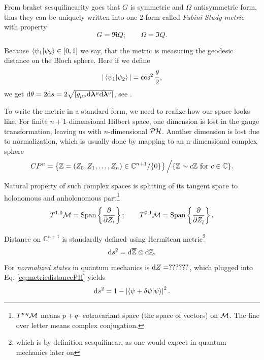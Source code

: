 From braket sesquilinearity goes that $G$ is symmetric and $\Omega$ antisymmetric form, thus they can be uniquely written into one 2-form called \emph{Fubini-Study metric} with property
\begin{equation}
    G=\Re Q ;\qquad \Omega=\Im Q.
\end{equation}

Because $\braket{\psi_1|\psi_2}\in[0,1]$ we say, that the metric is measuring the geodesic distance on the Bloch sphere. Here if we define
\begin{equation}
    |\braket{\psi_1|\psi_2}|=\cos^2 \frac{\theta}{2},
\end{equation}
we get $\mathrm{d} \theta= 2\mathrm{d} s=2\sqrt{|g_{\mu\nu}\mathrm{d} {\bm\lambda}^\mu\mathrm{d} {\bm\lambda}^\nu|}$, see \citet{cheng_quantum_2013}.

To write the metric in a standard form, we need to realize how our space looks like. For finite $n+1$-dimensional Hilbert space, one dimension is lost in the gauge transformation, leaving us with $n$-dimensional $\mathcal{PH}$. Another dimension is lost due to normalization, which is usually done by mapping to an n-dimensional complex sphere
$$CP^n= \left\{ \mathbb{Z}=(Z_0,Z_1,\dots,Z_n)\in \mathbb{C}^{n+1}/\{0\} \right\}\Big/ \{\mathbb{Z}\sim c\mathbb{Z} \text{ for } c\in \mathbb{C}\}.$$

Natural property of such complex spaces is splitting of its tangent space to holonomous and anholonomous part\footnote{$T^{p,q}\mathcal{M}$ means $p+q$- cotravariant space (the space of vectors) on $\mathcal{M}$. The line over letter means complex conjugation.}
$$T^{1,0}\mathcal{M}=\text{Span}\left\{\frac{\partial}{\partial Z_i}\right\}; \qquad T^{0,1}\mathcal{M}=\text{Span}\left\{\frac{\partial}{\partial Z_{\overline{i}}}\right\}.$$


Distance on $\mathbb{C}^{n+1}$ is standardly defined using Hermitean metric\footnote{which is by definition sesquilinear, as one would expect in quantum mechanics later on} 
\begin{equation}
    \mathrm{d} s^2 = \mathrm{d} \overline{\mathbb{Z}} \otimes \mathrm{d} \mathbb{Z}.
\label{eq:metricdistancePH}
\end{equation}


For \emph{normalized states} in quantum mechanics is $\mathrm{d} Z=??????$, which plugged into Eq. \ref{eq:metricdistancePH} yields
\begin{equation}
    \mathrm{d} s^2 = 1-\left|\braket{\psi+\delta \psi|\psi}\right|^2.
    \label{eq:distanceInPH}
\end{equation}


